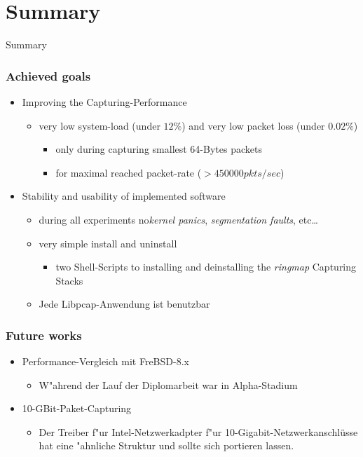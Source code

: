 \documentclass{beamer}
\begin{document}
\section{Summary}
\begin{frame}
	\begin{center}
	\huge{Summary}
	\end{center}
\end{frame}
\begin{frame}
\frametitle{Achieved goals}
\begin{itemize}
	\item Improving the Capturing-Performance
		\begin{itemize}
			\item very low  system-load (under $12\%$) and very low
				packet loss  (under  $0.02\%$)
				\begin{itemize}
					\item only during capturing smallest  64-Bytes packets
					\item for maximal reached packet-rate ($ > 450000 pkts/sec$) 
				\end{itemize}
		\end{itemize}
	\item Stability and usability of implemented software
		\begin{itemize}
			\item during all experiments no\emph{kernel panics}, \emph{segmentation faults}, etc\ldots
			\item very simple install and uninstall
				\begin{itemize}
					\item two Shell-Scripts to installing  and deinstalling the   
						\emph{ringmap} Capturing Stacks
				\end{itemize}
			\item Jede Libpcap-Anwendung ist benutzbar
		\end{itemize}
\end{itemize}
\end{frame}

\begin{frame}
\frametitle{Future works}
\begin{itemize}
	\item Performance-Vergleich mit FreBSD-8.x
		\begin{itemize}
			\item W"ahrend der Lauf der Diplomarbeit war in Alpha-Stadium\newline
		\end{itemize}
	\item 10-GBit-Paket-Capturing
		\begin{itemize}
			\item Der Treiber f"ur Intel-Netzwerkadpter f"ur 10-Gigabit-Netzwerkanschlüsse hat 
				eine "ahnliche Struktur und sollte sich portieren lassen. 
		\end{itemize}
\end{itemize}
\end{frame}
\end{document}
